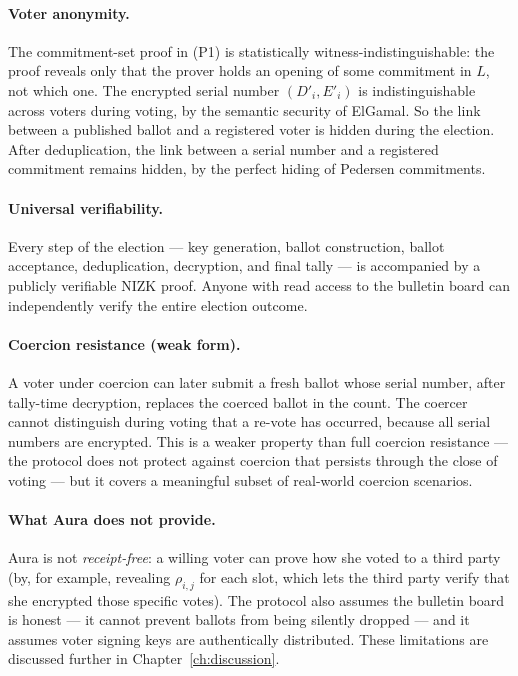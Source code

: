 \documentclass[12pt,a4paper,oneside]{report}
\begin{document}
\paragraph{Voter anonymity.}
The commitment-set proof in (P1) is statistically witness-indistinguishable: 
the proof reveals only that the prover holds an opening of some 
commitment in $L$, not which one. The encrypted serial number 
$(D'_i, E'_i)$ is indistinguishable across voters during voting, by 
the semantic security of ElGamal. So the link between a published 
ballot and a registered voter is hidden during the election. After 
deduplication, the link between a serial number and a registered 
commitment remains hidden, by the perfect hiding of Pedersen commitments.

\paragraph{Universal verifiability.}
Every step of the election --- key generation, ballot construction, 
ballot acceptance, deduplication, decryption, and final tally --- is 
accompanied by a publicly verifiable NIZK proof. Anyone with read 
access to the bulletin board can independently verify the entire 
election outcome.

\paragraph{Coercion resistance (weak form).}
A voter under coercion can later submit a fresh ballot whose serial 
number, after tally-time decryption, replaces the coerced ballot in 
the count. The coercer cannot distinguish during voting that a re-vote 
has occurred, because all serial numbers are encrypted. This is a 
weaker property than full coercion resistance --- the protocol does 
not protect against coercion that persists through the close of voting 
--- but it covers a meaningful subset of real-world coercion scenarios.

\paragraph{What Aura does not provide.}
Aura is not \textit{receipt-free}: a willing voter can prove how she 
voted to a third party (by, for example, revealing $\rho_{i, j}$ for 
each slot, which lets the third party verify that she encrypted those 
specific votes). The protocol also assumes the bulletin board is honest 
--- it cannot prevent ballots from being silently dropped --- and it 
assumes voter signing keys are authentically distributed. These 
limitations are discussed further in Chapter~\ref{ch:discussion}.
\end{document}
